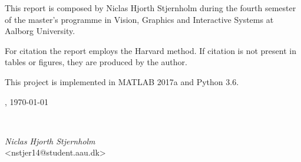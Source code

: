This report is composed by Niclas Hjorth Stjernholm during the fourth semester of the master's programme in Vision, Graphics and Interactive Systems at Aalborg University.

For citation the report employs the Harvard method. If citation is not present in tables or figures, they are produced by the author.

This project is implemented in MATLAB 2017a and Python 3.6.

\vspace{\baselineskip}\hfill \AAU, \today
\vfill\noindent
\begin{center}
\
\begin{minipage}[b]{0.45\textwidth}
  \centering
  \textit{Niclas Hjorth Stjernholm}\\
  {\footnotesize <nstjer14@student.aau.dk>}
\end{minipage}

\end{center}
